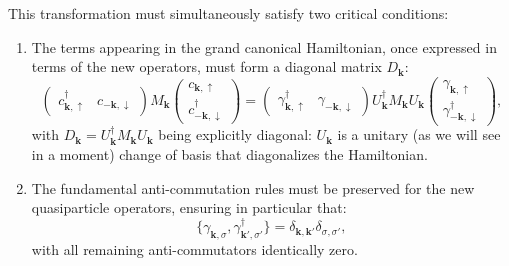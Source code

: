 This transformation must simultaneously satisfy two critical conditions:
\begin{enumerate}
    \item The terms appearing in the grand canonical Hamiltonian, once expressed in terms of the new operators, must form a diagonal matrix \( D_{\mathbf{k}} \):
          \[
              \begin{pmatrix} c_{\mathbf{k},\uparrow}^\dagger & c_{-\mathbf{k},\downarrow} \end{pmatrix} M_{\mathbf{k}} \begin{pmatrix} c_{\mathbf{k},\uparrow} \\ c_{-\mathbf{k},\downarrow}^\dagger \end{pmatrix} = \begin{pmatrix} \gamma_{\mathbf{k},\uparrow}^\dagger & \gamma_{-\mathbf{k},\downarrow} \end{pmatrix} U_{\mathbf{k}}^\dagger M_{\mathbf{k}} U_{\mathbf{k}} \begin{pmatrix} \gamma_{\mathbf{k},\uparrow} \\ \gamma_{-\mathbf{k},\downarrow}^\dagger \end{pmatrix},
          \]
          with \( D_{\mathbf{k}} = U_{\mathbf{k}}^\dagger M_{\mathbf{k}} U_{\mathbf{k}} \) being explicitly diagonal: \(U_{\mathbf{k}}\) is a unitary (as we will see in a moment) change of basis that diagonalizes the Hamiltonian.
    \item The fundamental anti-commutation rules must be preserved for the new quasiparticle operators, ensuring in particular that:
          \[
              \{ \gamma_{\mathbf{k},\sigma}, \gamma_{\mathbf{k}',\sigma'}^\dagger \} = \delta_{\mathbf{k},\mathbf{k}'} \delta_{\sigma,\sigma'},
          \]
          with all remaining anti-commutators identically zero.
\end{enumerate}

